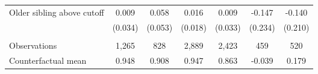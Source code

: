{{\begin{tabular}{lcccccc}
Older sibling above cutoff&       0.009   &       0.058   &       0.016   &       0.009   &      -0.147   &      -0.140   \\
                    &     (0.034)   &     (0.053)   &     (0.018)   &     (0.033)   &     (0.234)   &     (0.210)   \\
                    &               &               &               &               &               &               \\
Observations        &       1,265   &         828   &       2,889   &       2,423   &         459   &         520   \\
Counterfactual mean &       0.948   &       0.908   &       0.947   &       0.863   &      -0.039   &       0.179   \\
 

\bottomrule
\end{tabular}
}
}
